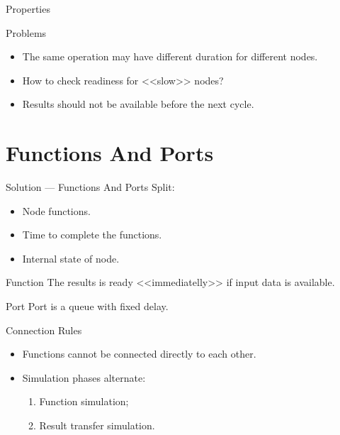 \begin{frame}{Properties}
\centering
{}
\end{frame}

\begin{frame}{Problems}
\begin{itemize}
\item The same operation may have different duration for different nodes.
\item How to check readiness for <<slow>> nodes?
\item Results should not be available before the next cycle.
\end{itemize}
\end{frame}

\section{Functions And Ports}

\begin{frame}{Solution --- Functions And Ports}
Split:
\begin{itemize}
\item Node functions.
\item Time to complete the functions.
\item Internal state of node.
\end{itemize}
\end{frame}

\begin{frame}{Function}
The results is ready <<immediatelly>> if input data is available.
\vfill
\centering
{}
\end{frame}

\begin{frame}{Port}
Port is a queue with fixed delay.
\vfill
\centering
{}
\end{frame}

\begin{frame}{Connection Rules}
\begin{itemize}
\item Functions cannot be connected directly to each other.
\item Simulation phases alternate:
  \begin{enumerate}
  \item Function simulation;
  \item Result transfer simulation.
  \end{enumerate}
\end{itemize}
\end{frame}

